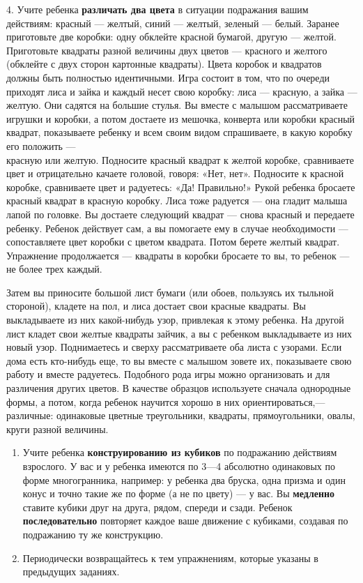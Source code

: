 \documentclass[a5paper]{book}
\begin{document}
4. Учите ребенка \textbf{различать два цвета} в ситуации подражания
вашим действиям: красный --- желтый, синий --- желтый, зеленый ---
белый. Заранее приготовьте две коробки: одну обклейте красной бумагой,
другую --- желтой. Приготовьте квадраты разной величины двух цветов ---
красного и желтого (обклейте с двух сторон картонные квадраты). Цвета
коробок и квадратов должны быть полностью идентичными. Игра состоит в
том, что по очереди приходят лиса и зайка и каждый несет свою коробку:
лиса --- красную, а зайка --- желтую. Они садятся на большие стулья. Вы
вместе с малышом рассматриваете игрушки и коробки, а потом достаете из
мешочка, конверта или коробки красный квадрат, показываете ребенку и
всем своим видом спрашиваете, в какую коробку его положить ---\\
красную или желтую. Подносите красный квадрат к желтой коробке,
сравниваете цвет и отрицательно качаете головой, говоря: «Нет, нет».
Подносите к красной коробке, сравниваете цвет и радуетесь: «Да!
Правильно!» Рукой ребенка бросаете красный квадрат в красную коробку.
Лиса тоже радуется --- она гладит малыша лапой по головке. Вы достаете
следующий квадрат --- снова красный и передаете ребенку. Ребенок
действует сам, а вы помогаете ему в случае необходимости ---
сопоставляете цвет коробки с цветом квадрата. Потом берете желтый
квадрат. Упражнение продолжается --- квадраты в коробки бросаете то вы,
то ребенок --- не более трех каждый.

Затем вы приносите большой лист бумаги (или обоев, пользуясь их тыльной
стороной), кладете на пол, и лиса достает свои красные квадраты. Вы
выкладываете из них какой-нибудь узор, привлекая к этому ребенка. На
другой лист кладет свои желтые квадраты зайчик, а вы с ребенком
выкладываете из них новый узор. Поднимаетесь и сверху рассматриваете оба
листа с узорами. Если дома есть кто-нибудь еще, то вы вместе с малышом
зовете их, показываете свою работу и вместе радуетесь. Подобного рода
игры можно организовать и для различения других цветов. В качестве
образцов используете сначала однородные формы, а потом, когда ребенок
научится хорошо в них ориентироваться,--- различные: одинаковые цветные
треугольники, квадраты, прямоугольники, овалы, круги разной величины.


\begin{enumerate}
\def\labelenumi{\arabic{enumi}.}
\setcounter{enumi}{4}
\item
  
  Учите ребенка \textbf{конструированию из кубиков} по подражанию
  действиям взрослого. У вас и у ребенка имеются по 3---4 абсолютно
  одинаковых по форме многогранника, например: у ребенка два бруска,
  одна призма и один конус и точно такие же по форме (а не по цвету) ---
  у вас. Вы \textbf{медленно} ставите кубики друг на друга, рядом,
  спереди и сзади. Ребенок \textbf{последовательно} повторяет каждое
  ваше движение с кубиками, создавая по подражанию ту же конструкцию.
  
\item
  
  Периодически возвращайтесь к тем упражнениям, которые указаны в
  предыдущих заданиях.
  
\end{enumerate}
\end{document}
